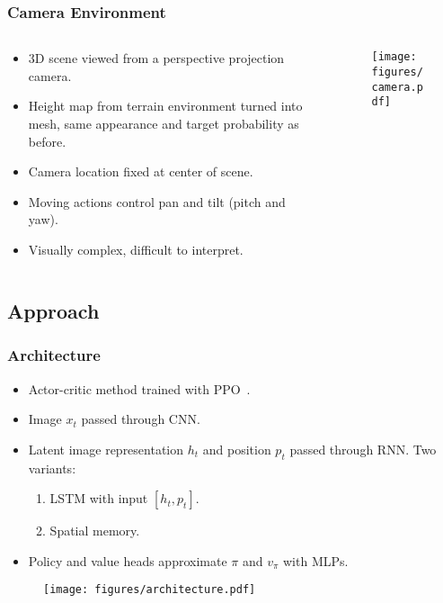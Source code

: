 \begin{frame}
    \frametitle{Camera Environment}
    \begin{columns}
        \begin{column}{0.5\textwidth}
            \begin{itemize}
                \item 3D scene viewed from a perspective projection camera.
                \item Height map from terrain environment turned into mesh, same appearance and target probability as before.
                \item Camera location fixed at center of scene.
                \item Moving actions control pan and tilt (pitch and yaw).
                \item Visually complex, difficult to interpret.
            \end{itemize}
        \end{column}
        \begin{column}{0.5\textwidth}
            \begin{figure}
                \centering
                \texttt{[image: figures/camera.pdf]}
            \end{figure}
        \end{column}
    \end{columns}
\end{frame}

\subsection{Approach}

\begin{frame}
    \frametitle{Architecture}

    \begin{itemize}
        \item Actor-critic method trained with PPO~\cite{schulman_ppo_2017}.
        \item Image \(x_t\) passed through CNN.
        \item Latent image representation \(h_t\) and position \(p_t\) passed through RNN. Two variants:
        \begin{enumerate}
            \item LSTM with input \(\left\lbrack h_t, p_t \right\rbrack\).
            \item Spatial memory.
        \end{enumerate}
        \item Policy and value heads approximate \(\pi\) and \(v_\pi\) with MLPs.
    \end{itemize}

    \begin{figure}
        \centering
        \texttt{[image: figures/architecture.pdf]}
    \end{figure}
\end{frame}

